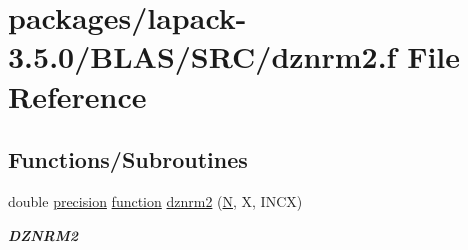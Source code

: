 \hypertarget{lapack-3_85_80_2BLAS_2SRC_2dznrm2_8f}{}\section{packages/lapack-\/3.5.0/\+B\+L\+A\+S/\+S\+R\+C/dznrm2.f File Reference}
\label{lapack-3_85_80_2BLAS_2SRC_2dznrm2_8f}
\subsection*{Functions/\+Subroutines}
\begin{DoxyCompactItemize}
\item 
double \hyperlink{numinquire_8h_a2c8e616467665d0b2814d4c1589ba74e}{precision} \hyperlink{afunc_8m_a7b5e596df91eadea6c537c0825e894a7}{function} \hyperlink{group__double__blas__level1_ga969fee86423deeced6013320c9b35b28}{dznrm2} (\hyperlink{polmisc_8c_a0240ac851181b84ac374872dc5434ee4}{N}, X, I\+N\+C\+X)
\begin{DoxyCompactList}\small\item\em {\bfseries D\+Z\+N\+R\+M2} \end{DoxyCompactList}\end{DoxyCompactItemize}
